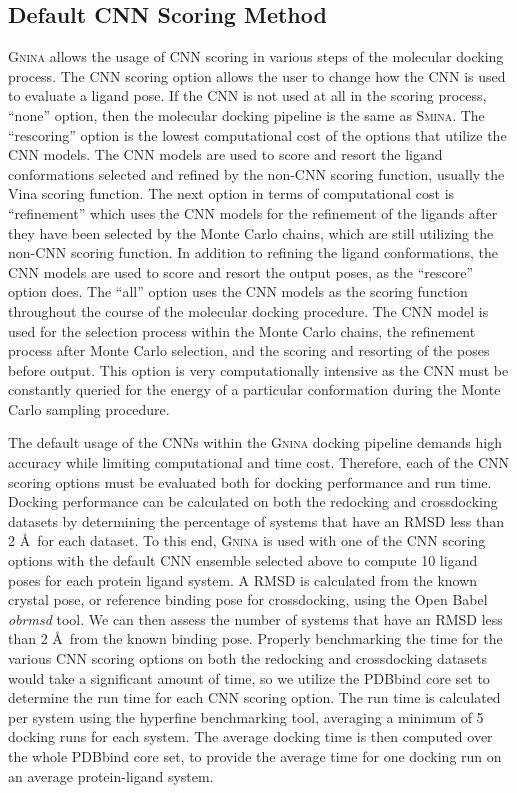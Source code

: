 \documentclass[journal=jcisd8,manuscript=article]{achemso}
\begin{document}
\subsection{Default CNN Scoring Method}
\textsc{Gnina} allows the usage of CNN scoring in various steps of the molecular docking process. The CNN scoring option allows the user to change how the CNN is used to evaluate a ligand pose. If the CNN is not used at all in the scoring process, ``none'' option, then the molecular docking pipeline is the same as \textsc{Smina}. The ``rescoring'' option is the lowest computational cost of the options that utilize the CNN models. The CNN models are used to score and resort the ligand conformations selected and refined by the non-CNN scoring function, usually the Vina scoring function. The next option in terms of computational cost is ``refinement'' which uses the CNN models for the refinement of the ligands after they have been selected by the Monte Carlo chains, which are still utilizing the non-CNN scoring function. In addition to refining the ligand conformations, the CNN models are used to score and resort the output poses, as the ``rescore'' option does. The ``all'' option uses the CNN models as the scoring function throughout the course of the molecular docking procedure. The CNN model is used for the selection process within the Monte Carlo chains, the refinement process after Monte Carlo selection, and the scoring and resorting of the poses before output. This option is very computationally intensive as the CNN must be constantly queried for the energy of a particular conformation during the Monte Carlo sampling procedure.

The default usage of the CNNs within the \textsc{Gnina} docking pipeline demands high accuracy while limiting computational and time cost. Therefore, each of the CNN scoring options must be evaluated both for docking performance and run time. Docking performance can be calculated on both the redocking and crossdocking datasets by determining the percentage of systems that have an RMSD less than 2 \AA~for each dataset. To this end, \textsc{Gnina} is used with one of the CNN scoring options with the default CNN ensemble selected above to compute 10 ligand poses for each protein ligand system. A RMSD is calculated from the known crystal pose, or reference binding pose for crossdocking, using the Open Babel \textit{obrmsd} tool. We can then assess the number of systems that have an RMSD less than 2 \AA~from the known binding pose. Properly benchmarking the time for the various CNN scoring options on both the redocking and crossdocking datasets would take a significant amount of time, so we utilize the PDBbind core set to determine the run time for each CNN scoring option. The run time is calculated per system using the hyperfine benchmarking tool\cite{hyperfine}, averaging a minimum of 5 docking runs for each system. The average docking time is then computed over the whole PDBbind core set, to provide the average time for one docking run on an average protein-ligand system.
\end{document}
